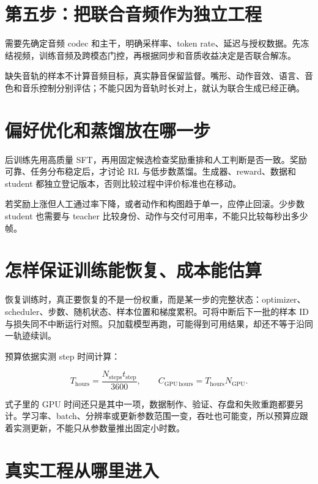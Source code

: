 \section{第五步：把联合音频作为独立工程}\label{seedance-m13-ux7b2cux4e94ux6b65ux628aux8054ux5408ux97f3ux9891ux4f5cux4e3aux72ecux7acbux5de5ux7a0b}

需要先确定音频 codec 和主干，明确采样率、token rate、延迟与授权数据。先冻结视频，训练音频及跨模态门控，再根据同步和音质收益决定是否联合解冻。

缺失音轨的样本不计算音频目标，真实静音保留监督。嘴形、动作音效、语言、音色和音乐控制分别评估；不能只因为音轨时长对上，就认为联合生成已经正确。

\section{偏好优化和蒸馏放在哪一步}\label{seedance-m13-ux504fux597dux4f18ux5316ux548cux84b8ux998fux653eux5728ux54eaux4e00ux6b65}

后训练先用高质量 SFT，再用固定候选检查奖励重排和人工判断是否一致。奖励可靠、任务分布稳定后，才讨论 RL 与低步数蒸馏。生成器、reward、数据和 student 都独立登记版本，否则比较过程中评价标准也在移动。

若奖励上涨但人工通过率下降，或者动作和构图趋于单一，应停止回滚。少步数 student 也需要与 teacher 比较身份、动作与交付可用率，不能只比较每秒出多少帧。

\section{怎样保证训练能恢复、成本能估算}\label{seedance-m13-ux600eux6837ux4fddux8bc1ux8badux7ec3ux80fdux6062ux590dux6210ux672cux80fdux4f30ux7b97}

恢复训练时，真正要恢复的不是一份权重，而是某一步的完整状态：optimizer、scheduler、步数、随机状态、样本位置和梯度累积。可将中断后下一批的样本 ID 与损失同不中断运行对照。只加载模型再跑，可能得到可用结果，却还不等于沿同一轨迹续训。

预算依据实测 step 时间计算：

\[
T_{\mathrm{hours}}=\frac{N_{\mathrm{steps}}t_{\mathrm{step}}}{3600},
\qquad
C_{\mathrm{GPU\,hours}}=T_{\mathrm{hours}}N_{\mathrm{GPU}}.
\]

式子里的 GPU 时间还只是其中一项，数据制作、验证、存盘和失败重跑都要另计。学习率、batch、分辨率或更新参数范围一变，吞吐也可能变，所以预算应跟着实测更新，不能只从参数量推出固定小时数。

\section{真实工程从哪里进入}\label{seedance-m13-ux771fux5b9eux5de5ux7a0bux4eceux54eaux91ccux8fdbux5165}

